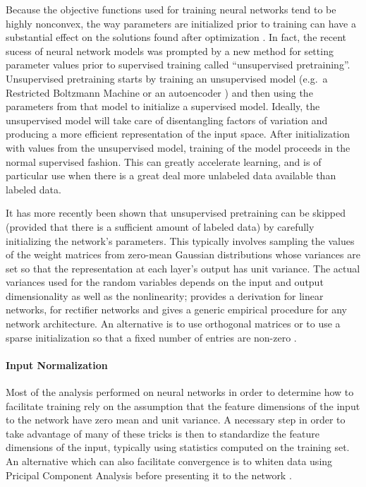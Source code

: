 Because the objective functions used for training neural networks tend to be highly nonconvex, the way parameters are initialized prior to training can have a substantial effect on the solutions found after optimization \cite{sutskever2013importance}.
In fact, the recent sucess of neural network models was prompted by a new method for setting parameter values prior to supervised training called ``unsupervised pretraining''.
Unsupervised pretraining starts by training an unsupervised model (e.g.\ a Restricted Boltzmann Machine \cite{hinton2006reducing,hinton2006fast} or an autoencoder \cite{bengio2007greedy,erhan2009difficulty}) and then using the parameters from that model to initialize a supervised model.
Ideally, the unsupervised model will take care of disentangling factors of variation and producing a more efficient representation of the input space.
After initialization with values from the unsupervised model, training of the model proceeds in the normal supervised fashion.
This can greatly accelerate learning, and is of particular use when there is a great deal more unlabeled data available than labeled data.

It has more recently been shown that unsupervised pretraining can be skipped (provided that there is a sufficient amount of labeled data) by carefully initializing the network's parameters.
This typically involves sampling the values of the weight matrices from zero-mean Gaussian distributions whose variances are set so that the representation at each layer's output has unit variance.
The actual variances used for the random variables depends on the input and output dimensionality as well as the nonlinearity; \cite{glorot2010understanding} provides a derivation for linear networks, \cite{he2015delving} for rectifier networks and \cite{mishkin2015all} gives a generic empirical procedure for any network architecture.
An alternative is to use orthogonal matrices \cite{saxe2013exact} or to use a sparse initialization so that a fixed number of entries are non-zero \cite{sutskever2013importance}.


\paragraph{Input Normalization}

Most of the analysis performed on neural networks in order to determine how to facilitate training rely on the assumption that the feature dimensions of the input to the network have zero mean and unit variance.
A necessary step in order to take advantage of many of these tricks is then to standardize the feature dimensions of the input, typically using statistics computed on the training set.
An alternative which can also facilitate convergence is to whiten data using Pricipal Component Analysis before presenting it to the network \cite{lecun2012efficient}.

